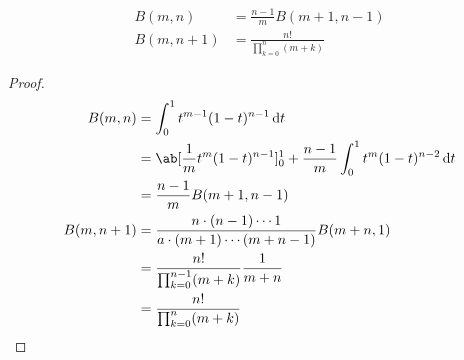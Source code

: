 \documentclass[uplatex,diffipdfmx,a4paper,11pt]{jlreq}
\begin{document}
\begin{theorem}
  \begin{align}
    B(m, n)     & = \frac{n - 1}{m}B(m + 1, n - 1)  \\
    B(m, n + 1) & = \frac{n!}{\prod_{k=0}^n(m + k)}
  \end{align}
\end{theorem}
\begin{proof}
  \begin{align}
    B(m, n)     & = \int_{0}^{1}t^{m-1}(1-t)^{n-1}\dl{t}                                               \\
                & = \ab[\frac{1}{m}t^m(1-t)^{n-1}]_0^1 + \frac{n-1}{m}\int_{0}^{1}t^m(1-t)^{n-2}\dl{t} \\
                & = \frac{n - 1}{m}B(m + 1, n - 1)                                                     \\
    B(m, n + 1) & = \frac{n\cdot(n - 1)\cdots 1}{a\cdot(m + 1)\cdots(m + n - 1)}B(m + n, 1)            \\
                & = \frac{n!}{\prod_{k = 0}^{n-1}(m + k)}\frac{1}{m + n}                               \\
                & = \frac{n!}{\prod_{k = 0}^{n}(m + k)}
  \end{align}
\end{proof}
\end{document}

